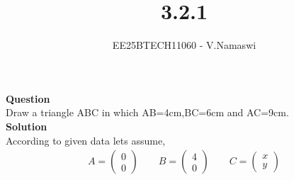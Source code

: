 \documentclass[journal]{IEEEtran}
\begin{document}

\vspace{3cm}

\title{3.2.1}
\author{EE25BTECH11060 - V.Namaswi}
{\let\newpage\relax\maketitle}

\renewcommand{\thefigure}{\theenumi}
\renewcommand{\thetable}{\theenumi}
\setlength{\intextsep}{10pt} %
\textbf{Question}\\Draw a triangle ABC in which AB=4cm,BC=6cm and AC=9cm.\\
\textbf{Solution}\\
According to given data lets assume,\\
\begin{align*}
    A=\begin{pmatrix}0\\0\end{pmatrix}\qquad 
B=\begin{pmatrix}4\\0\end{pmatrix}\qquad 
C=\begin{pmatrix}x\\y\end{pmatrix}   
\end{align*}
 
\end{document}
